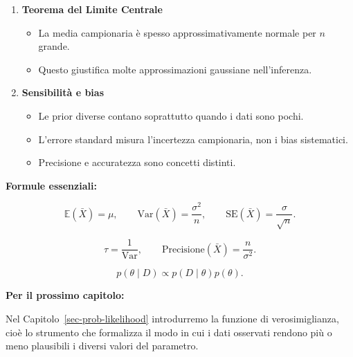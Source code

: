 \documentclass[
  italian,
  letterpaper,
  a4paper,
  11pt,
  open=any]{scrbook}
\providecommand{\tightlist}{%
  \setlength{\itemsep}{0pt}\setlength{\parskip}{0pt}}
\theoremstyle{plain}
\theoremstyle{definition}
\theoremstyle{definition}
\theoremstyle{remark}
\begin{document}
\begin{tcolorbox}
\begin{enumerate}
  \begin{itemize}
  \tightlist
  \item
    La media campionaria converge al valore atteso.
  \item
    Spiega perché l'evidenza empirica si stabilizza con molti dati.
  \end{itemize}
\item
  \textbf{Teorema del Limite Centrale}

  \begin{itemize}
  \tightlist
  \item
    La media campionaria è spesso approssimativamente normale per \(n\)
    grande.
  \item
    Questo giustifica molte approssimazioni gaussiane nell'inferenza.
  \end{itemize}
\item
  \textbf{Sensibilità e bias}

  \begin{itemize}
  \tightlist
  \item
    Le prior diverse contano soprattutto quando i dati sono pochi.
  \item
    L'errore standard misura l'incertezza campionaria, non i bias
    sistematici.
  \item
    Precisione e accuratezza sono concetti distinti.
  \end{itemize}
\end{enumerate}

\textbf{Formule essenziali:}

\[
\mathbb{E}(\bar{X}) = \mu, \qquad
\text{Var}(\bar{X}) = \frac{\sigma^2}{n}, \qquad
\text{SE}(\bar{X}) = \frac{\sigma}{\sqrt{n}}.
\]

\[
\tau = \frac{1}{\text{Var}}, \qquad
\text{Precisione}(\bar{X}) = \frac{n}{\sigma^2}.
\]

\[
p(\theta \mid D) \propto p(D \mid \theta)p(\theta).
\]

\textbf{Per il prossimo capitolo:}

Nel Capitolo~\ref{sec-prob-likelihood} introdurremo la funzione di
verosimiglianza, cioè lo strumento che formalizza il modo in cui i dati
osservati rendono più o meno plausibili i diversi valori del parametro.

\end{tcolorbox}
\end{document}
